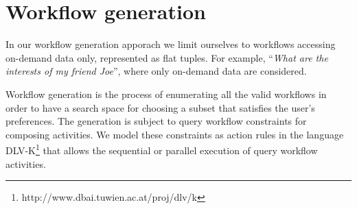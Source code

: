 

\section{Workflow generation} \label{sec:queryWorkflowGen}
 
In our workflow generation apporach we limit ourselves to workflows accessing on-demand data only, represented as flat tuples. For example, ``\textit{What are the interests of my friend Joe}'', where only on-demand data are considered.

Workflow generation is the process of enumerating all the valid workflows in order to have a search space for choosing a subset that satisfies the user's preferences. The generation is subject to query workflow constraints for composing activities. We model these constraints as action rules in the language DLV-K\footnote{http://www.dbai.tuwien.ac.at/proj/dlv/k} that allows the sequential or parallel execution of query workflow activities.
         
